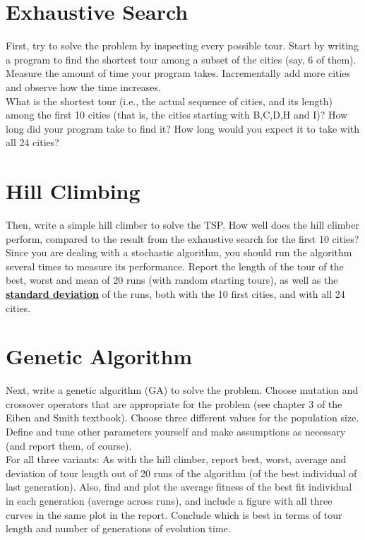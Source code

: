 \documentclass{article}           %
\begin{document}
\section*{Exhaustive Search}
First, try to solve the problem by inspecting every possible tour. Start by
writing a program to find the shortest tour among a subset of the cities (say,
6 of them). Measure the amount of time your program takes. Incrementally add
more cities and observe how the time increases.\\

What is the shortest tour (i.e., the actual sequence of cities, and its
length) among the first 10 cities (that is, the cities starting with B,C,D,H
and I)? How long did your program take to find it? How long would you expect
it to take with all 24 cities?

\section*{Hill Climbing}
Then, write a simple hill climber to solve the TSP. How well does the hill
climber perform, compared to the result from the exhaustive search for the
first 10 cities? Since you are dealing with a stochastic algorithm, you should
run the algorithm several times to measure its performance. Report the length
of the tour of the best, worst and mean of 20 runs (with random starting
tours), as well as the
\href{https://en.wikipedia.org/wiki/Standard_deviation}{\textbf{standard deviation}}
of the runs, both with the 10 first cities, and with all 24 cities.

\section*{Genetic Algorithm}
Next, write a genetic algorithm (GA) to solve the problem. Choose mutation
and crossover operators that are appropriate for the problem (see chapter 3
of the Eiben and Smith textbook). Choose three different values for the
population size. Define and tune other parameters yourself and make
assumptions as necessary (and report them, of course).\\

For all three variants: As with the hill climber, report best, worst, average
and deviation of tour length out of 20 runs of the algorithm (of the best
individual of last generation). Also, find and plot the average fitness of
the best fit individual in each generation (average across runs), and include
a figure with all three curves in the same plot in the report. Conclude which
is best in terms of tour length and number of generations of evolution time.\\
\end{document}
